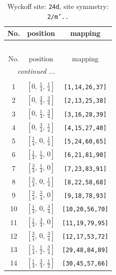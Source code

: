 \documentclass[fleqn,8pt]{jsarticle}
\begin{document}
\begin{longtable}{ccc}
\caption{Wyckoff site: {\tt 24d}, site symmetry: {\tt 2/m'..}}
 \\
 \hline \hline
No. & position & mapping \\ \hline \endfirsthead

\multicolumn{2}{l}{\tablename\ \thetable{}} \\
 \hline \hline
No. & position & mapping \\ \hline \endhead

 \hline \hline
\multicolumn{2}{r}{\footnotesize\it continued ...} \\ \endfoot

 \hline \hline
\multicolumn{2}{r}{} \\ \endlastfoot

1 & $\left[ 0,\, \frac{1}{4},\, \frac{1}{4} \right]$ & {\tt [1,14,26,37]} \\ \hline
2 & $\left[ 0,\, \frac{3}{4},\, \frac{3}{4} \right]$ & {\tt [2,13,25,38]} \\ \hline
3 & $\left[ 0,\, \frac{1}{4},\, \frac{3}{4} \right]$ & {\tt [3,16,28,39]} \\ \hline
4 & $\left[ 0,\, \frac{3}{4},\, \frac{1}{4} \right]$ & {\tt [4,15,27,40]} \\ \hline
5 & $\left[ \frac{1}{4},\, 0,\, \frac{1}{4} \right]$ & {\tt [5,24,60,65]} \\ \hline
6 & $\left[ \frac{1}{4},\, \frac{1}{4},\, 0 \right]$ & {\tt [6,21,81,90]} \\ \hline
7 & $\left[ \frac{3}{4},\, \frac{1}{4},\, 0 \right]$ & {\tt [7,23,83,91]} \\ \hline
8 & $\left[ \frac{3}{4},\, 0,\, \frac{1}{4} \right]$ & {\tt [8,22,58,68]} \\ \hline
9 & $\left[ \frac{3}{4},\, \frac{3}{4},\, 0 \right]$ & {\tt [9,18,78,93]} \\ \hline
10 & $\left[ \frac{1}{4},\, 0,\, \frac{3}{4} \right]$ & {\tt [10,20,56,70]} \\ \hline
11 & $\left[ \frac{1}{4},\, \frac{3}{4},\, 0 \right]$ & {\tt [11,19,79,95]} \\ \hline
12 & $\left[ \frac{3}{4},\, 0,\, \frac{3}{4} \right]$ & {\tt [12,17,53,72]} \\ \hline
13 & $\left[ \frac{1}{4},\, \frac{1}{2},\, \frac{3}{4} \right]$ & {\tt [29,48,84,89]} \\ \hline
14 & $\left[ \frac{1}{4},\, \frac{3}{4},\, \frac{1}{2} \right]$ & {\tt [30,45,57,66]} \\ \hline

\end{longtable}
\end{document}

